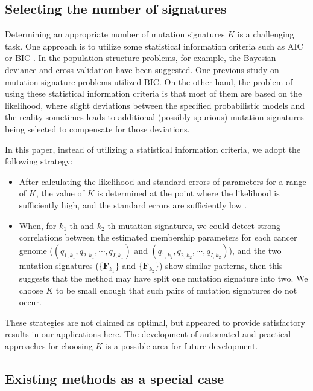 \documentclass[10pt,letterpaper]{article}
\begin{document}
\subsection*{Selecting the number of signatures}

Determining an appropriate number of mutation signatures $K$ is a challenging task. 
One approach is to utilize some statistical information criteria such as AIC \cite{akaike1974new} or BIC \cite{schwarz1978estimating}.
In the population structure problems, for example, 
the Bayesian deviance \cite{pmid10835412} 
and cross-validation \cite{alexander2011enhancements} have been suggested.
One previous study on mutation signature problems \cite{pmid23628380} utilized BIC.
On the other hand, the problem of using these statistical information criteria is that most of them are based on the likelihood,
where slight deviations between the specified probabilistic models and the reality sometimes leads to additional
(possibly spurious) mutation signatures being selected to
compensate for those deviations.

In this paper, instead of utilizing a statistical information criteria, we adopt the following strategy:
\begin{itemize}
\item
After calculating the likelihood and standard errors of parameters for a range of $K$,
the value of $K$ is determined at the point where the likelihood is sufficiently high, 
and the standard errors are sufficiently low \cite{pmid23318258}.

\item
When, for $k_1$-th and $k_2$-th mutation signatures, 
we could detect strong correlations between the estimated membership parameters 
for each cancer genome
($(q_{1,k_1}, q_{2,k_1}, \cdots, q_{I,k_1})$ and $(q_{1,k_2}, q_{2,k_2}, \cdots, q_{I,k_2})$),
and the two mutation signatures ($\{ \bm{F}_{k_1} \}$ and $\{ \bm{F}_{k_2} \}$) show similar patterns,
then this suggests that the method may have split one mutation signature into two. We choose $K$ to be small enough that such pairs of mutation signatures do not occur.
\end{itemize}

These strategies are not claimed as optimal, but appeared
to  provide satisfactory results in our applications here.
The development of automated and practical approaches for choosing $K$ is a possible area for future development.


\subsection*{Existing methods as a special case}
\end{document}
